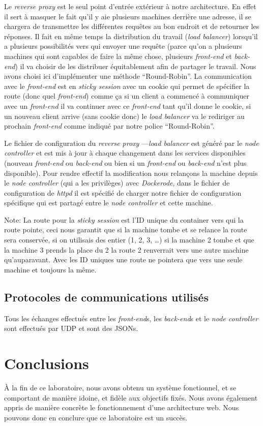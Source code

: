 \documentclass[a4paper,11pt,titlepage]{article}
\begin{document}
Le \emph{reverse proxy} est le seul point d'entrée extérieur à notre architecture. En effet il sert à masquer le fait qu'il y
aie plusieurs machines derrière une adresse, il se chargera de transmettre les différentes requêtes au bon endroit et de
retourner les réponses. Il fait en même temps la distribution du travail (\emph{load balancer}) lorsqu'il a plusieurs
possibilités vers qui envoyer une requête (parce qu'on a plusieurs machines qui sont capables de faire la même chose,
plusieurs \emph{front-end} et \emph{back-end}) il va choisir de les distribuer équitablement afin de partager le travail.
Nous avons choisi ici d'implémenter une méthode ``Round-Robin''. La communication avec le \emph{front-end} est en
\emph{sticky session} avec un cookie qui permet de spécifier la route (donc quel \emph{front-end}) comme ça si un client a
commencé à communiquer avec un \emph{front-end} il va continuer avec ce \emph{front-end} tant qu'il donne le cookie, si un
nouveau client arrive (sans cookie donc) le \emph{load balancer} va le rediriger au prochain \emph{front-end} comme indiqué
par notre police ``Round-Robin''.

Le fichier de configuration du \emph{reverse proxy} ---\emph{load balancer} est généré par le \emph{node controller} et est
mis à jour à chaque changement dans les services disponibles (nouveau \emph{front-end} ou \emph{back-end} ou bien si un
\emph{front-end} ou \emph{back-end} n'est plus disponible). Pour rendre effectif la modification nous relançons la machine
depuis le \emph{node controller} (qui a les privilèges) avec \emph{Dockerode}, dans le fichier de configuration de
\emph{httpd} il est spécifié de charger notre fichier de configuration spécifique qui est partagé entre le \emph{node
controller} et cette machine.

Note: La route pour la \emph{sticky session} est l'ID unique du container vers qui la route pointe, ceci nous garantit que si
la machine tombe et se relance la route sera conservée, si on utilisais des entier (1, 2, 3, \ldots) si la machine 2 tombe et
que la machine 3 prends la place du 2 la route 2 renverrait vers une autre machine qu'auparavant. Avec les ID uniques une
route ne pointera que vers une seule machine et toujours la même.

\subsection{Protocoles de communications utilisés}
Tous les échanges effectués entre les \emph{front-end}s, les \emph{back-end}s et le \emph{node controller} sont effectués par
UDP et sont des JSONs.

\section{Conclusions}
À la fin de ce laboratoire, nous avons obtenu un système fonctionnel, et se comportant de manière idoine, et fidèle aux
objectifs fixés. Nous avons également appris de manière concrète le fonctionnement d'une architecture web. Nous pouvons
donc en conclure que ce laboratoire est un succès.
\end{document}
